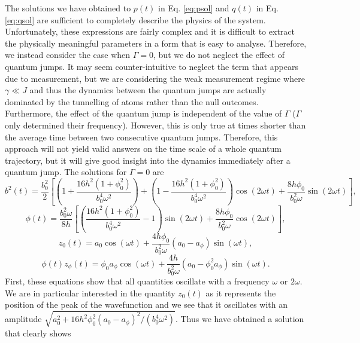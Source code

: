 The solutions we have obtained to $p(t)$ in Eq. \eqref{eq:psol} and
$q(t)$ in Eq. \eqref{eq:qsol} are sufficient to completely describe
the physics of the system. Unfortunately, these expressions are fairly
complex and it is difficult to extract the physically meaningful
parameters in a form that is easy to analyse. Therefore, we instead
consider the case when $\Gamma = 0$, but we do not neglect the effect
of quantum jumps. It may seem counter-intuitive to neglect the term
that appears due to measurement, but we are considering the weak
measurement regime where $\gamma \ll J$ and thus the
dynamics between the quantum jumps are actually dominated by the
tunnelling of atoms rather than the null outcomes. Furthermore, the
effect of the quantum jump is independent of the value of $\Gamma$
($\Gamma$ only determined their frequency). However, this is only true
at times shorter than the average time between two consecutive quantum
jumps. Therefore, this approach will not yield valid answers on the
time scale of a whole quantum trajectory, but it will give good
insight into the dynamics immediately after a quantum jump. The
solutions for $\Gamma = 0$ are
\begin{equation}
b^2(t) = \frac{b_0^2}{2} \left[ \left(1 + \frac{16 h^2 (1 + \phi_0^2)}
    {b_0^4 \omega^2} \right) + \left(1 - \frac{16 h^2 (1 + \phi_0^2)}
    {b_0^4 \omega^2} \right) \cos (2 \omega t) + \frac{8 h \phi_0}{b_0^2
    \omega} \sin(2 \omega t) \right],
\end{equation}
\begin{equation}
  \phi(t) = \frac{b_0^2 \omega} {8 h} \left[ \left( \frac{16 h^2 (1 + \phi_0^2)}
      {b_0^4 \omega^2} - 1 \right) \sin (2 \omega t) + \frac{8 h
      \phi_0} {b_0^2 \omega} \cos (2 \omega t) \right],
\end{equation}
\begin{equation}
  z_0(t) = a_0 \cos(\omega t) + \frac{4 h \phi_0} {b_0^2 \omega} (a_0 -
  a_\phi) \sin (\omega t),
\end{equation}
\begin{equation}
  \phi(t) z_\phi(t) = \phi_0 a_\phi \cos (\omega t)  + \frac{4 h}
  {b_0^2 \omega} (a_0 - \phi_0^2 a_\phi) \sin( \omega t).
\end{equation}
First, these equations show that all quantities oscillate with a
frequency $\omega$ or $2 \omega$. We are in particular interested in
the quantity $z_0(t)$ as it represents the position of the peak of the
wavefunction and we see that it oscillates with an amplitude
$\sqrt{a_0^2 + 16 h^2 \phi_0^2 (a_0 - a_\phi)^2 / (b_0^4
  \omega^2)}$. Thus we have obtained a solution that clearly shows
